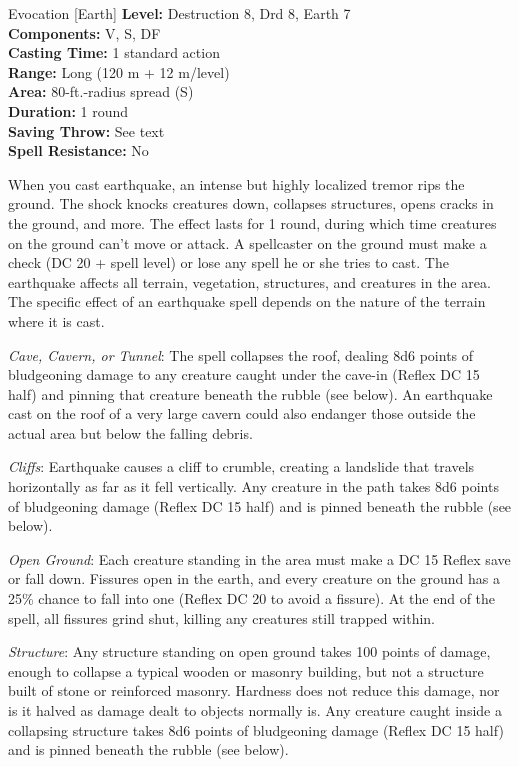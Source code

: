 {Evocation [Earth]}
{
	\textbf{Level:}
	Destruction 8, Drd 8, Earth 7\\
	\textbf{Components:}
	V, S, DF\\
	\textbf{Casting Time:}
	1 standard action\\
	\textbf{Range:}
	Long (120 m + 12 m/level)\\
	\textbf{Area:}
	80-ft.-radius spread (S)\\
	\textbf{Duration:}
	1 round\\
	\textbf{Saving Throw:}
	See text\\
	\textbf{Spell Resistance:}
	No\\
}
{
	When you cast earthquake, an intense but highly localized tremor rips the ground. The shock knocks creatures down, collapses structures, opens cracks in the ground, and more. The effect lasts for 1 round, during which time creatures on the ground can't move or attack. A spellcaster on the ground must make a  check (DC 20 + spell level) or lose any spell he or she tries to cast. The earthquake affects all terrain, vegetation, structures, and creatures in the area. The specific effect of an earthquake spell depends on the nature of the terrain where it is cast.

	\textit{Cave, Cavern, or Tunnel}:
	The spell collapses the roof, dealing 8d6 points of bludgeoning damage to any creature caught under the cave-in (Reflex DC 15 half) and pinning that creature beneath the rubble (see below). An earthquake cast on the roof of a very large cavern could also endanger those outside the actual area but below the falling debris.

	\textit{Cliffs}:
	Earthquake causes a cliff to crumble, creating a landslide that travels horizontally as far as it fell vertically. Any creature in the path takes 8d6 points of bludgeoning damage (Reflex DC 15 half) and is pinned beneath the rubble (see below).

	\textit{Open Ground}:
	Each creature standing in the area must make a DC 15 Reflex save or fall down. Fissures open in the earth, and every creature on the ground has a 25\% chance to fall into one (Reflex DC 20 to avoid a fissure). At the end of the spell, all fissures grind shut, killing any creatures still trapped within.

	\textit{Structure}:
	Any structure standing on open ground takes 100 points of damage, enough to collapse a typical wooden or masonry building, but not a structure built of stone or reinforced masonry. Hardness does not reduce this damage, nor is it halved as damage dealt to objects normally is. Any creature caught inside a collapsing structure takes 8d6 points of bludgeoning damage (Reflex DC 15 half) and is pinned beneath the rubble (see below).

}
